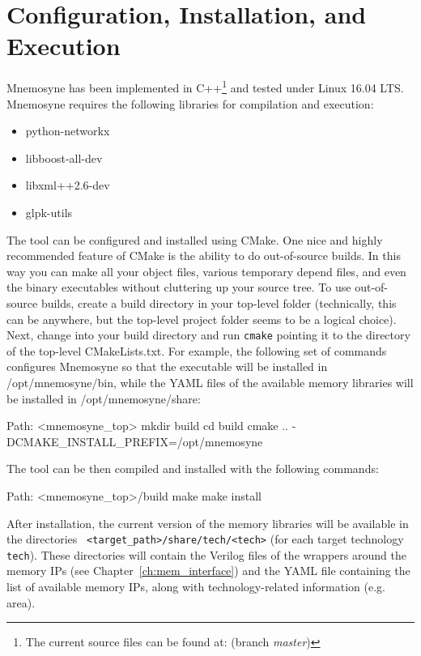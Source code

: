 \section{Configuration, Installation, and Execution}

{\sc Mnemosyne} has been implemented in C++\footnote{The current
  source files can be found at:
   (branch
        {\em master})} and tested under Linux 16.04 LTS.
{\sc Mnemosyne} requires the following libraries for compilation and
execution:
\begin{itemize}
\item python-networkx
\item libboost-all-dev
\item libxml++2.6-dev
\item glpk-utils
\end{itemize}
The tool can be configured and installed using CMake. One nice and
highly recommended feature of CMake is the ability to do out-of-source
builds. In this way you can make all your object files, various
temporary depend files, and even the binary executables without
cluttering up your source tree. To use out-of-source builds, create a
build directory in your top-level folder (technically, this can be
anywhere, but the top-level project folder seems to be a logical
choice). Next, change into your build directory and run {\tt cmake}
pointing it to the directory of the top-level CMakeLists.txt.  For
example, the following set of commands configures {\sc Mnemosyne} so
that the executable will be installed in {\sc /opt/mnemosyne/bin}, while
the YAML files of the available memory libraries will be installed in
{\sc /opt/mnemosyne/share}:

\begin{commandshell}{Path: <mnemosyne\_top>}
  mkdir build
  cd build
  cmake .. -DCMAKE_INSTALL_PREFIX=/opt/mnemosyne
\end{commandshell}

\noindent The tool can be then compiled and installed with the
following commands:

\begin{commandshell}{Path: <mnemosyne\_top>/build}
  make
  make install
\end{commandshell}

\noindent After installation, the current version of the memory
libraries will be available in the directories {\tt
<target\_path>/share/tech/<tech>} (for each target technology {\tt
tech}). These directories will contain the Verilog files of the wrappers
around the memory IPs (see Chapter~\ref{ch:mem_interface}) and the YAML file
containing the list of available memory IPs, along with technology-related
information (e.g. area).

